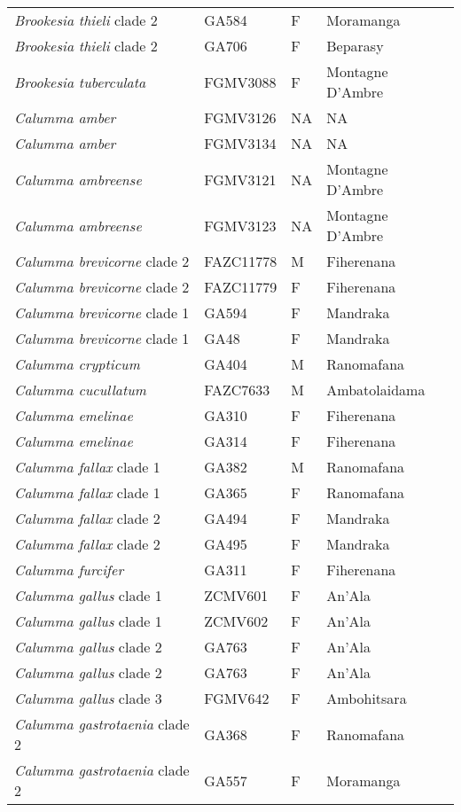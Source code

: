 \begin{longtable}{llll}
\textit{Brookesia thieli} clade 2 & GA584 & F & Moramanga\\
\textit{Brookesia thieli} clade 2 & GA706 & F & Beparasy\\
\textit{Brookesia tuberculata} & FGMV3088 & F & Montagne D'Ambre\\
\hline
\textit{Calumma amber} & FGMV3126 & NA & NA\\
\textit{Calumma amber} & FGMV3134 & NA & NA\\
\textit{Calumma ambreense} & FGMV3121 & NA & Montagne D'Ambre\\
\textit{Calumma ambreense} & FGMV3123 & NA & Montagne D'Ambre\\
\textit{Calumma brevicorne} clade 2 & FAZC11778 & M & Fiherenana\\
\textit{Calumma brevicorne} clade 2 & FAZC11779 & F & Fiherenana\\
\textit{Calumma brevicorne} clade 1 & GA594 & F & Mandraka\\
\textit{Calumma brevicorne} clade 1 & GA48 & F & Mandraka\\
\textit{Calumma crypticum} & GA404 & M & Ranomafana\\
\textit{Calumma cucullatum} & FAZC7633 & M & Ambatolaidama\\
\textit{Calumma emelinae} & GA310 & F & Fiherenana\\
\textit{Calumma emelinae} & GA314 & F & Fiherenana\\
\textit{Calumma fallax} clade 1 & GA382 & M & Ranomafana\\
\textit{Calumma fallax} clade 1 & GA365 & F & Ranomafana\\
\textit{Calumma fallax} clade 2 & GA494 & F & Mandraka\\
\textit{Calumma fallax} clade 2 & GA495 & F & Mandraka\\
\textit{Calumma furcifer} & GA311 & F & Fiherenana\\
\textit{Calumma gallus} clade 1 & ZCMV601 & F & An'Ala\\
\textit{Calumma gallus} clade 1 & ZCMV602 & F & An'Ala\\
\textit{Calumma gallus} clade 2 & GA763 & F & An'Ala\\
\textit{Calumma gallus} clade 2 & GA763 & F & An'Ala\\
\textit{Calumma gallus} clade 3 & FGMV642 & F & Ambohitsara\\
\textit{Calumma gastrotaenia} clade 2 & GA368 & F & Ranomafana\\
\textit{Calumma gastrotaenia} clade 2 & GA557 & F & Moramanga\\

\end{longtable}
